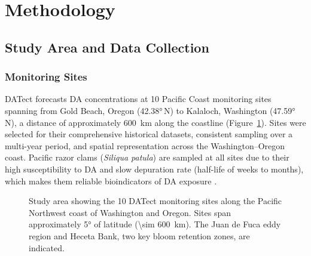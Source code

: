 \documentclass[preprint,12pt,authoryear]{elsarticle}
\begin{document}
\section{Methodology}
\label{sec:methodology}

\subsection{Study Area and Data Collection}
\label{sec:data-collection}

\subsubsection{Monitoring Sites}

DATect forecasts DA concentrations at 10 Pacific Coast monitoring sites spanning from Gold Beach, Oregon (\ang{42.38}\,N) to Kalaloch, Washington (\ang{47.59}\,N), a distance of approximately \SI{600}{\kilo\meter} along the coastline (Figure~\ref{fig:study-area}). Sites were selected for their comprehensive historical datasets, consistent sampling over a multi-year period, and spatial representation across the Washington--Oregon coast. Pacific razor clams (\textit{Siliqua patula}) are sampled at all sites due to their high susceptibility to DA and slow depuration rate (half-life of weeks to months), which makes them reliable bioindicators of DA exposure \citep{Drum1993, Wekell1994, McCabe2023}.

\begin{figure}[!htbp]
\centering
{}
\caption{Study area showing the 10 DATect monitoring sites along the Pacific Northwest coast of Washington and Oregon. Sites span approximately \ang{5} of latitude (\SI{\sim 600}{\kilo\meter}). The Juan de Fuca eddy region and Heceta Bank, two key bloom retention zones, are indicated.}
\label{fig:study-area}
\end{figure}
\end{document}
